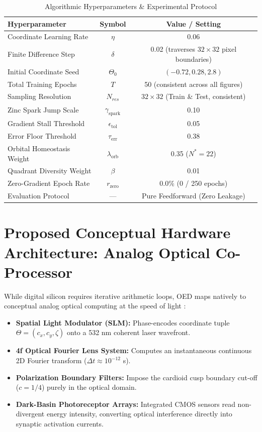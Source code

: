 \documentclass[10pt,journal,compsoc,twocolumn]{article}
\begin{document}
\begin{table}[t]
\centering
\footnotesize
\caption{Algorithmic Hyperparameters \& Experimental Protocol}
\label{tab:hyperparams}
\begin{tabular}{lcc}
\toprule
\textbf{Hyperparameter} & \textbf{Symbol} & \textbf{Value / Setting} \\
\midrule
Coordinate Learning Rate & $\eta$ & 0.06 \\
Finite Difference Step & $\delta$ & 0.02 (traverses $32\times 32$ pixel boundaries) \\
Initial Coordinate Seed & $\Theta_0$ & $(-0.72, 0.28, 2.8)$ \\
Total Training Epochs & $T$ & 50 (consistent across all figures) \\
Sampling Resolution & $N_{res}$ & $32 \times 32$ (Train \& Test, consistent) \\
Zinc Spark Jump Scale & $\gamma_{\mathrm{spark}}$ & 0.10 \\
Gradient Stall Threshold & $\epsilon_{\mathrm{tol}}$ & 0.05 \\
Error Floor Threshold & $\tau_{\mathrm{err}}$ & 0.38 \\
Orbital Homeostasis Weight & $\lambda_{\mathrm{orb}}$ & 0.35 ($N^* = 22$) \\
Quadrant Diversity Weight & $\beta$ & 0.01 \\
Zero-Gradient Epoch Rate & $r_{\mathrm{zero}}$ & 0.0\% (0 / 250 epochs) \\
Evaluation Protocol & --- & Pure Feedforward (Zero Leakage) \\
\bottomrule
\end{tabular}
\end{table}

\section{Proposed Conceptual Hardware Architecture: Analog Optical Co-Processor}
\label{sec:hardware}
While digital silicon requires iterative arithmetic loops, OED maps natively to conceptual analog optical computing at the speed of light \cite{wetzstein2020inference}:
\begin{itemize}
    \item \textbf{Spatial Light Modulator (SLM):} Phase-encodes coordinate tuple $\Theta = (c_x, c_y, \zeta)$ onto a 532 nm coherent laser wavefront.
    \item \textbf{4f Optical Fourier Lens System:} Computes an instantaneous continuous 2D Fourier transform ($\Delta t \approx 10^{-12}$ s).
    \item \textbf{Polarization Boundary Filters:} Impose the cardioid cusp boundary cut-off ($c = 1/4$) purely in the optical domain.
    \item \textbf{Dark-Basin Photoreceptor Arrays:} Integrated CMOS sensors read non-divergent energy intensity, converting optical interference directly into synaptic activation currents.
\end{itemize}
\end{document}
